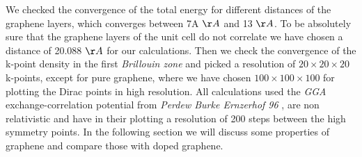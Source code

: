			We checked the convergence of the total energy for different distances of the graphene layers, which converges between 7A $\AA$ and 13 $\AA$. To be absolutely sure that the graphene layers of the unit cell do not correlate we have chosen a distance of 20.088 $\AA$ for our calculations. Then we check the convergence of the k-point density in the first \textit{Brillouin zone} and picked a resolution of $20\times20\times20$ k-points, except for pure graphene, where we have chosen $100\times100\times100$ for plotting the Dirac points in high resolution. All calculations used the \textit{GGA} exchange-correlation potential from \textit{Perdew Burke Ernzerhof 96} \cite{GGA}, are non relativistic and have in their plotting a resolution of 200 steps between the high symmetry points. In the following section we will discuss some properties of graphene and compare those with doped graphene.
